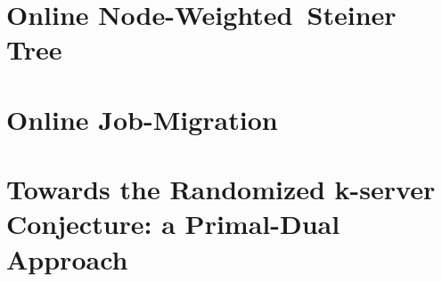 \documentclass[10pt, twocolumn]{article}
\begin{document}
\section{Online \mbox{Node-Weighted Steiner} Tree}
\label{steiner-tree}


\section{Online Job-Migration}
\label{job-migration}


\section{Towards the Randomized k-server Conjecture: a Primal-Dual Approach}
\label{k-server}





\end{document}
